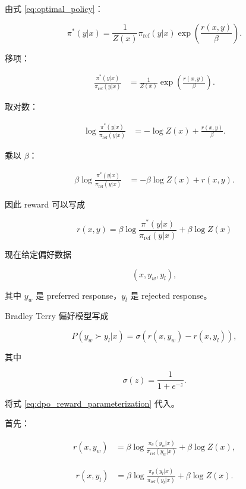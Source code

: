 \documentclass[11pt,a4paper]{ctexart}
\newcommand{\piref}{\pi_{\mathrm{ref}}}
\newcommand{\pitheta}{\pi_{\theta}}
\begin{document}
由式 \eqref{eq:optimal_policy}：

\begin{equation}
\pi^*(y|x)
=
\frac{1}{Z(x)}
\piref(y|x)
\exp
\left(
\frac{r(x,y)}{\beta}
\right).
\end{equation}

移项：

\begin{align}
\frac{\pi^*(y|x)}{\piref(y|x)}
&=
\frac{1}{Z(x)}
\exp
\left(
\frac{r(x,y)}{\beta}
\right).
\end{align}

取对数：

\begin{align}
\log
\frac{\pi^*(y|x)}{\piref(y|x)}
&=
-\log Z(x)
+
\frac{r(x,y)}{\beta}.
\end{align}

乘以 $\beta$：

\begin{align}
\beta
\log
\frac{\pi^*(y|x)}{\piref(y|x)}
&=
-\beta\log Z(x)
+
r(x,y).
\end{align}

因此 reward 可以写成

\begin{equation}
\boxed{
r(x,y)
=
\beta
\log
\frac{\pi^*(y|x)}{\piref(y|x)}
+
\beta\log Z(x)
}
\label{eq:dpo_reward_parameterization}
\end{equation}

现在给定偏好数据

\[
(x,y_w,y_l),
\]

其中 $y_w$ 是 preferred response，$y_l$ 是 rejected response。

Bradley Terry 偏好模型写成

\begin{equation}
P(y_w\succ y_l|x)
=
\sigma
\left(
r(x,y_w)-r(x,y_l)
\right),
\end{equation}

其中

\[
\sigma(z)=\frac{1}{1+e^{-z}}.
\]

将式 \eqref{eq:dpo_reward_parameterization} 代入。

首先：

\begin{align}
r(x,y_w)
&=
\beta
\log
\frac{\pitheta(y_w|x)}{\piref(y_w|x)}
+
\beta\log Z(x),
\end{align}

\begin{align}
r(x,y_l)
&=
\beta
\log
\frac{\pitheta(y_l|x)}{\piref(y_l|x)}
+
\beta\log Z(x).
\end{align}
\end{document}
